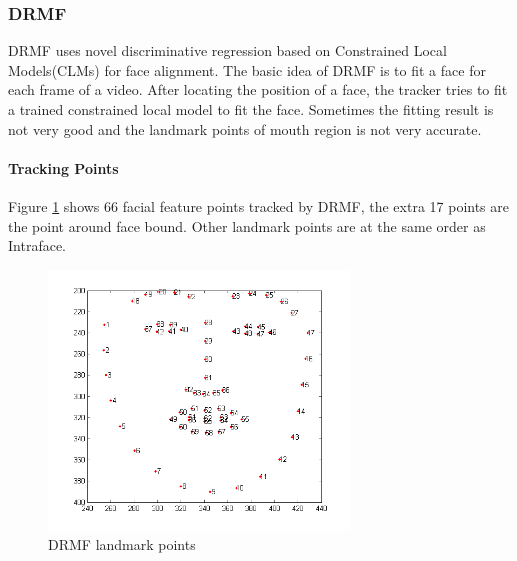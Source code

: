 \subsubsection{DRMF}
DRMF uses novel discriminative regression based on Constrained Local Models(CLMs) for face alignment\cite{asthana2013robust}. The basic idea of DRMF is to fit a face for each frame of a video. After locating the position of a face, the tracker tries to fit a trained constrained local model to fit the face. Sometimes the fitting result is not very good and the landmark points of mouth region is not very accurate.
\paragraph{Tracking Points}
Figure \ref{fig:DPI} shows 66 facial feature points tracked by DRMF, the extra 17 points are the point around face bound. Other landmark points are at the same order as Intraface.
\begin{figure}[ht]
\centering
\includegraphics[width = 80mm]{imgs/FacialIndexDRMF.png}
\caption{DRMF landmark points}
\label{fig:DPI}
\end{figure}
